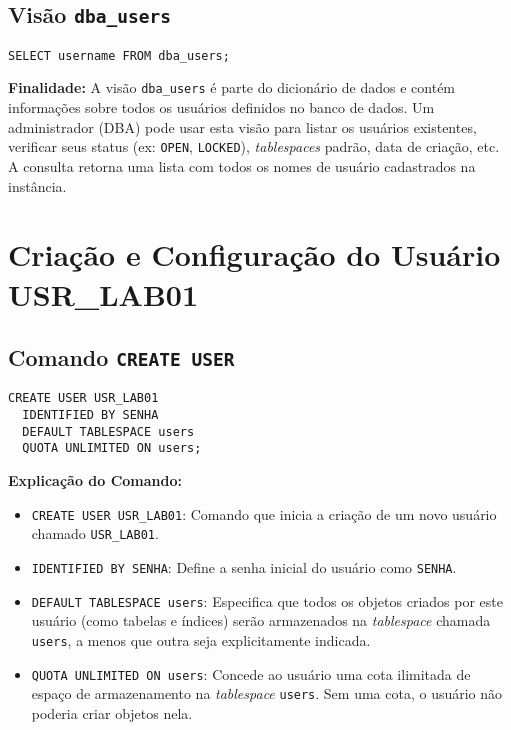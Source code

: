 \documentclass[a4paper, 12pt]{article}
\begin{document}
\subsection{Visão \texttt{dba\_users}}
\begin{lstlisting}
SELECT username FROM dba_users;
\end{lstlisting}
\textbf{Finalidade:} A visão \texttt{dba\_users} é parte do dicionário de dados e contém informações sobre todos os usuários definidos no banco de dados. Um administrador (DBA) pode usar esta visão para listar os usuários existentes, verificar seus status (ex: \texttt{OPEN}, \texttt{LOCKED}), \textit{tablespaces} padrão, data de criação, etc. A consulta retorna uma lista com todos os nomes de usuário cadastrados na instância.

\section{Criação e Configuração do Usuário USR\_LAB01}

\subsection{Comando \texttt{CREATE USER}}
\begin{lstlisting}
CREATE USER USR_LAB01 
  IDENTIFIED BY SENHA 
  DEFAULT TABLESPACE users 
  QUOTA UNLIMITED ON users;
\end{lstlisting}
\textbf{Explicação do Comando:}
\begin{itemize}
    \item \texttt{CREATE USER USR\_LAB01}: Comando que inicia a criação de um novo usuário chamado \texttt{USR\_LAB01}.
    \item \texttt{IDENTIFIED BY SENHA}: Define a senha inicial do usuário como \texttt{SENHA}.
    \item \texttt{DEFAULT TABLESPACE users}: Especifica que todos os objetos criados por este usuário (como tabelas e índices) serão armazenados na \textit{tablespace} chamada \texttt{users}, a menos que outra seja explicitamente indicada.
    \item \texttt{QUOTA UNLIMITED ON users}: Concede ao usuário uma cota ilimitada de espaço de armazenamento na \textit{tablespace} \texttt{users}. Sem uma cota, o usuário não poderia criar objetos nela.
\end{itemize}
\end{document}
